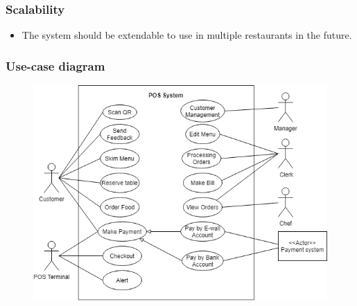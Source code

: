 \documentclass[11pt]{article}
\begin{document}
        \subsubsection*{Scalability}
        \begin{itemize}
            \item The system should be extendable to use in multiple restaurants in the future.
        \end{itemize}
        \subsubsection*{Use-case diagram}
        \begin{figure}[h]
            \centering
            \includegraphics[scale=0.8]{Use-case diagram/Use-case-diagram.png}
            \setlength{\parskip}{8pt}
        \end{figure}
\pagebreak
\end{document}
